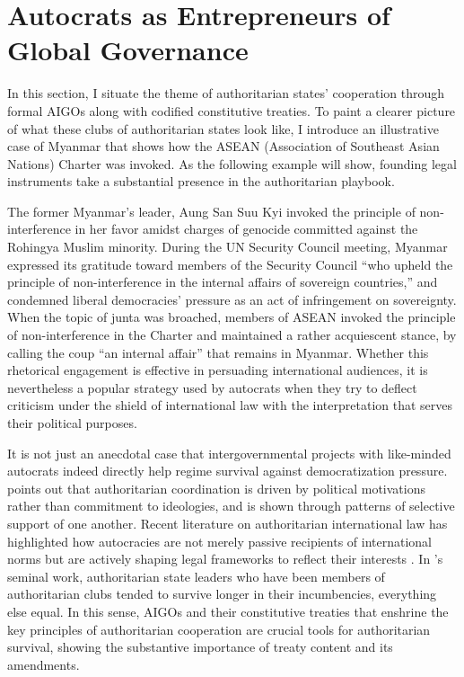 \documentclass[12pt]{article}
\begin{document}
\section{Autocrats as Entrepreneurs of Global Governance}

In this section, I situate the theme of authoritarian states' cooperation through formal AIGOs along with codified constitutive treaties. To paint a clearer picture of what these clubs of authoritarian states look like, I introduce an illustrative case of Myanmar that shows how the ASEAN (Association of Southeast Asian Nations) Charter was invoked. As the following example will show, founding legal instruments take a substantial presence in the authoritarian playbook.

The former Myanmar's leader, Aung San Suu Kyi invoked the principle of non-interference in her favor amidst charges of genocide committed against the Rohingya Muslim minority. During the UN Security Council meeting, Myanmar expressed its gratitude toward members of the Security Council ``who upheld the principle of non-interference in the internal affairs of sovereign countries,'' and condemned liberal democracies' pressure as an act of infringement on sovereignty. When the topic of junta was broached, members of ASEAN invoked the principle of non-interference in the Charter and maintained a rather acquiescent stance, by calling the coup ``an internal affair'' that remains in Myanmar. Whether this rhetorical engagement is effective in persuading international audiences, it is nevertheless a popular strategy used by autocrats when they try to deflect criticism under the shield of international law with the interpretation that serves their political purposes.

It is not just an anecdotal case that intergovernmental projects with like-minded autocrats indeed directly help regime survival against democratization pressure. \textcite{von_soest_democracy_2015} points out that authoritarian coordination is driven by political motivations rather than commitment to ideologies, and is shown through patterns of selective support of one another. Recent literature on authoritarian international law has highlighted how autocracies are not merely passive recipients of international norms but are actively shaping legal frameworks to reflect their interests \parencite{ginsburg_authoritarian_2020}. In \textcite{debre_clubs_2022}'s seminal work, authoritarian state leaders who have been members of authoritarian clubs tended to survive longer in their incumbencies, everything else equal. In this sense, AIGOs and their constitutive treaties that enshrine the key principles of authoritarian cooperation are crucial tools for authoritarian survival, showing the substantive importance of treaty content and its amendments.
\end{document}
